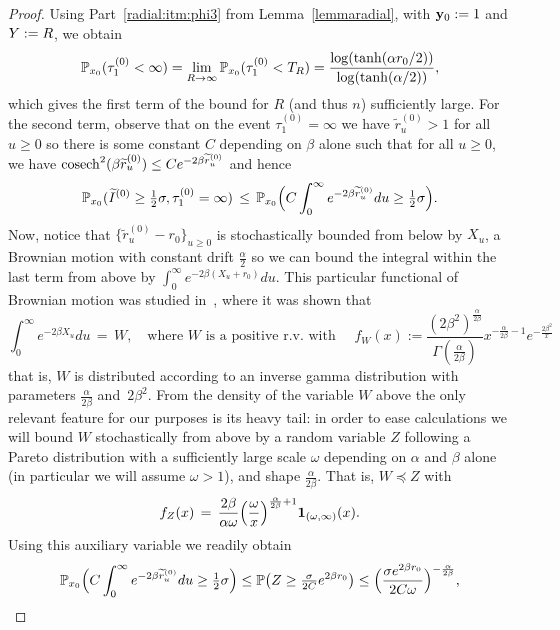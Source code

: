 \begin{proof}
Using Part~\eqref{radial:itm:phi3} from Lemma~\ref{lemmaradial}, with ${\bf y}_0:=1$ and $Y:=R$,  we obtain 
\[\mathbb{P}_{x_0}(\tau_{1}^{(0)}<\infty)=\lim_{R \to \infty}\mathbb{P}_{x_0}(\tau_{1}^{(0)}<T_R)=\frac{\log(\tanh(\alpha r_0/2))}{\log(\tanh(\alpha/2))},\]
which gives the first term of the bound for $R$ (and thus $n$) sufficiently large. For the second term, observe that on the event $\tau^{(0)}_1=\infty$ we have $\widetilde{r}^{(0)}_u>1$ for all $u\geq0$ so there is some constant $C$ depending on $\beta$ alone such that for all $u\geq 0$, we have $\operatorname{cosech}^2(\beta \widetilde{r}^{(0)}_u)\leq Ce^{-2\beta \widetilde{r}^{(0)}_u}$ and hence
\[\mathbb{P}_{x_0}(\widetilde{I}^{(0)}\geq\tfrac12\sigma,\tau^{(0)}_{1}=\infty)\,\leq\,\mathbb{P}_{x_0}\Big(C\int_0^{\infty}e^{-2\beta\widetilde{r}^{(0)}_u}du\geq\tfrac12\sigma\Big).\]
Now, notice that $\{\widetilde{r}_u^{(0)}-r_0\}_{u\geq0}$ %
is stochastically bounded from below by $X_u$, a Brownian motion with constant drift $\tfrac{\alpha}{2}$ so we can bound the integral within the last term from above by $\int_0^{\infty}e^{-2\beta(X_u+r_0)}du$. This particular functional of Brownian motion was studied in~\cite[Proposition~4.4.4]{dufresne}, where it was shown that
\[\int_0^\infty e^{-2\beta X_u}du\,=\,W,\quad\text{where }W\text{ is a positive r.v.~with }\quad f_{W}(x):=\frac{(2\beta^2)^\frac{\alpha}{2\beta}}{\Gamma(\frac{\alpha}{2\beta})}x^{-\frac{\alpha}{2\beta}-1}e^{-\frac{2\beta^2}{x}}\]
that is, $W$ is distributed according to an inverse gamma distribution with parameters $\frac{\alpha}{2\beta}$ and~$2\beta^2$. From the density of the variable $W$ above the only relevant feature for our purposes is its heavy tail: in order to ease calculations we will bound $W$ stochastically from above by a random variable $Z$ following a Pareto distribution with a sufficiently large scale $\omega$ depending on $\alpha$ and $\beta$ alone (in particular we will assume $\omega>1$), and shape $\frac{\alpha}{2\beta}$. That is, $W \preccurlyeq Z$ with
\[f_{Z}(x)\,=\,\frac{2\beta}{\alpha\omega}\Big(\frac{\omega}{x}\Big)^{\frac{\alpha}{2\beta}+1}{\bf 1}_{(\omega,\infty)}(x).\]
Using this auxiliary variable we readily obtain 
\[\mathbb{P}_{x_0}\Big(C\int_0^{\infty}e^{-2\beta\widetilde{r}^{(0)}_u}du\geq\tfrac12\sigma\Big)\leq\mathbb{P}\big(Z\geq\tfrac{\sigma}{2C}e^{2\beta r_0}\big)\leq\Big(\frac{\sigma e^{2\beta r_0}}{2C\omega}\Big)^{-\frac{\alpha}{2\beta}},\]

\end{proof}
